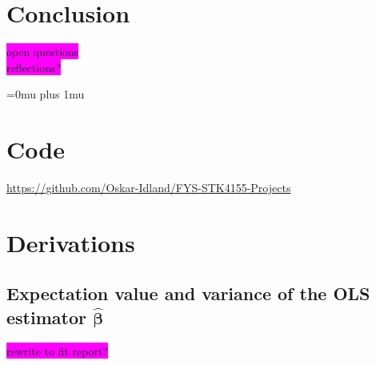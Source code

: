 \documentclass[aps,pra,english,notitlepage,reprint,nofootinbib]{revtex4-1}  %
\begin{document}
\section{Conclusion}\label{sec:conclusion}
\colorbox{magenta}{open questions} \\
\colorbox{magenta}{reflections?}



\Urlmuskip=0mu plus 1mu\relax
\onecolumngrid


\newpage
\appendix
\section{Code}\label{appsec:code}
\href{https://github.com/Oskar-Idland/FYS-STK4155-Projects}{https://github.com/Oskar-Idland/FYS-STK4155-Projects}

\section{Derivations}\label{appsec:derivations}
\subsection{Expectation value and variance of the OLS estimator \texorpdfstring{$\boldsymbol{\hat{\beta}}$}{Lg}}\label{subapp:beta OLS}
\colorbox{magenta}{rewrite to fit report?}
\end{document}
